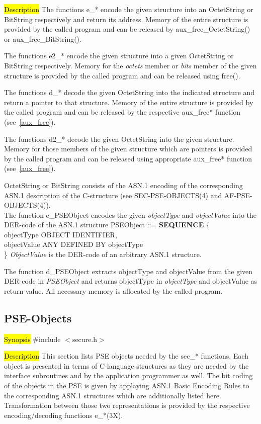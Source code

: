 \hl{Description}     
The functions e\_* encode the given structure into an OctetString or BitString
respectively and return its address. Memory of the entire structure is provided 
by the called program and can be released
by aux\_free\_OctetString() or aux\_free\_BitString(). 

The functions e2\_* encode the given structure into a given OctetString or BitString
respectively. Memory for the {\em octets} member or {\em bits} member of the given structure
is provided by the called program and can be released
using  free(). 

The functions d\_* decode the given OctetString into the indicated structure and return
a pointer to that structure. Memory of the entire structure is provided 
by the called program and can be released by the respective aux\_free* function (see~\ref{aux_free}).

The functions d2\_* decode the given OctetString into the given structure.
Memory for those members of the given structure which are pointers is provided 
by the called program and can be released using appropriate aux\_free* function (see~\ref{aux_free}).

OctetString or BitString consists of the ASN.1 encoding of the corresponding ASN.1 description of the C-structure (see SEC-PSE-OBJECTS(4) and AF-PSE-OBJECTS(4)). 
\\ [1em]
The function e\_PSEObject encodes the given {\em objectType} and {\em objectValue} into the
DER-code of the ASN.1 structure
\bc
{\small
\bvtab
PSEObject ::= \3 {\bf SEQUENCE} \{ \\
\5 objectType \3 OBJECT IDENTIFIER, \\
\5 objectValue \3 ANY DEFINED BY objectType \\
\3 \}
\evtab
}
\ec
{\em ObjectValue} is the DER-code of an arbitrary ASN.1 structure. 

The function d\_PSEObject extracts objectType and objectValue from the given
DER-code in {\em PSEObject} and returns objectType in {\em objectType} and
objectValue as return value. All necessary memory is allocated by the 
called program.

\subsection{PSE-Objects}
\label{sec-sw-cc}
\hl{Synopsis}
\#include $<$secure.h$>$ 

\hl{Description}     
This section lists PSE objects needed by the sec\_* functions. Each object is presented in terms
of C-language structures as they are needed by the interface subroutines and
by the application programmer as well. The bit coding of the objects in the PSE
is given by applaying ASN.1 Basic Encoding Rules to the corresponding ASN.1 structures which
are additionally listed here.
Transformation between those two representations
is provided by the respective encoding/decoding functions e\_*(3X).

